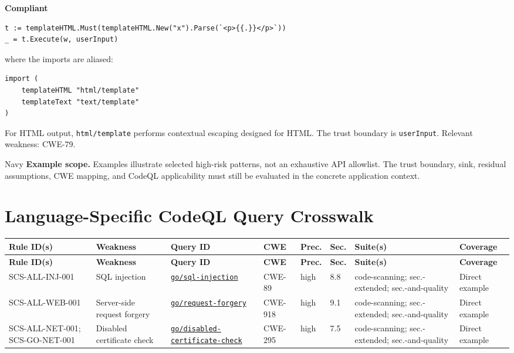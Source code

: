 \documentclass[10pt,letterpaper]{article}
\newcommand{\code}[1]{\texttt{\small #1}}
\begin{document}
\textbf{Compliant}\par
\begin{lstlisting}
t := templateHTML.Must(templateHTML.New("x").Parse(`<p>{{.}}</p>`))
_ = t.Execute(w, userInput)
\end{lstlisting}

where the imports are aliased:\par
\begin{lstlisting}
import (
    templateHTML "html/template"
    templateText "text/template"
)
\end{lstlisting}

For HTML output, \code{html/template} performs contextual escaping designed for HTML. The trust boundary is \code{userInput}. Relevant weakness: CWE-79.\par
\begin{callout}{Navy}
\textbf{Example scope.} Examples illustrate selected high-risk patterns, not an exhaustive API allowlist. The trust boundary, sink, residual assumptions, CWE mapping, and CodeQL applicability must still be evaluated in the concrete application context.
\end{callout}
\section{Language-Specific CodeQL Query Crosswalk}\begin{landscape}\scriptsize
\setlength{\tabcolsep}{2.6pt}
\begin{longtable}{@{}P{1.28in}P{1.12in}P{1.52in}P{0.78in}P{0.52in}P{0.48in}P{1.32in}P{0.82in}@{}}
\toprule
\textbf{Rule ID(s)} & \textbf{Weakness} & \textbf{Query ID} & \textbf{CWE} & \textbf{Prec.} & \textbf{Sec.} & \textbf{Suite(s)} & \textbf{Coverage}\\
\midrule
\endfirsthead
\toprule
\textbf{Rule ID(s)} & \textbf{Weakness} & \textbf{Query ID} & \textbf{CWE} & \textbf{Prec.} & \textbf{Sec.} & \textbf{Suite(s)} & \textbf{Coverage}\\
\midrule
\endhead
SCS-ALL-INJ-001 & SQL injection & \href{https://codeql.github.com/codeql-query-help/go/go-sql-injection/}{\code{go/sql-injection}} & CWE-89 & high & 8.8 & code-scanning; sec.-extended; sec.-and-quality & Direct example\\
SCS-ALL-WEB-001 & Server-side request forgery & \href{https://codeql.github.com/codeql-query-help/go/go-request-forgery/}{\code{go/request-forgery}} & CWE-918 & high & 9.1 & code-scanning; sec.-extended; sec.-and-quality & Direct example\\
SCS-ALL-NET-001; SCS-GO-NET-001 & Disabled certificate check & \href{https://codeql.github.com/codeql-query-help/go/go-disabled-certificate-check/}{\code{go/disabled-certificate-check}} & CWE-295 & high & 7.5 & code-scanning; sec.-extended; sec.-and-quality & Direct example\\
\bottomrule
\end{longtable}
\normalsize\end{landscape}
\end{document}
